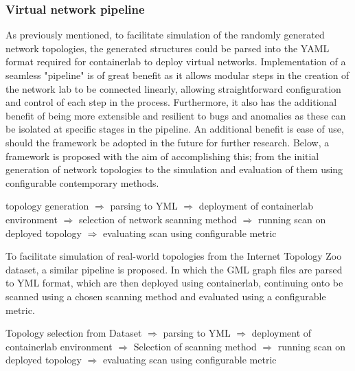 \subsubsection{Virtual network pipeline}
As previously mentioned, to facilitate simulation of the randomly generated network topologies, the generated structures could be parsed into the YAML format required for containerlab to deploy virtual networks. Implementation of a seamless "pipeline" is of great benefit as it allows modular steps in the creation of the network lab to be connected linearly, allowing straightforward configuration and control of each step in the process. Furthermore, it also has the additional benefit of being more extensible and resilient to bugs and anomalies as these can be isolated at specific stages in the pipeline. An additional benefit is ease of use, should the framework be adopted in the future for further research. Below, a framework is proposed with the aim of accomplishing this; from the initial generation of network topologies to the simulation and evaluation of them using configurable contemporary methods. 

topology generation $\Rightarrow$ parsing to YML $\Rightarrow$ deployment of containerlab environment $\Rightarrow$ selection of network scanning method $\Rightarrow$ running scan on deployed topology $\Rightarrow$ evaluating scan using configurable metric 

To facilitate simulation of real-world topologies from the Internet Topology Zoo dataset, a similar pipeline is proposed. In which the GML graph files are parsed to YML format, which are then deployed using containerlab, continuing onto be scanned using a chosen scanning method and evaluated using a configurable metric.  

Topology selection from Dataset $\Rightarrow$ parsing to YML $\Rightarrow$ deployment of containerlab environment $\Rightarrow$ Selection of scanning method $\Rightarrow$ running scan on deployed topology $\Rightarrow$ evaluating scan using configurable metric 


